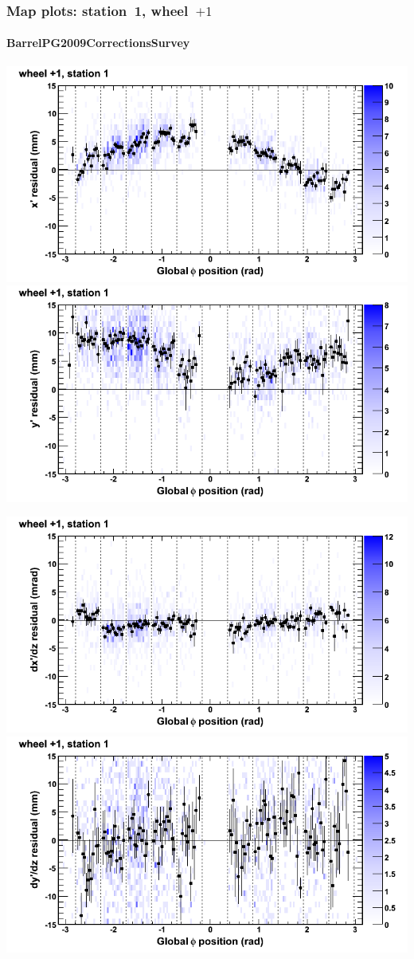 \documentclass[compress]{beamer}
\begin{document}
\begin{frame}
\frametitle{Map plots: station~1, wheel~$+1$}
\framesubtitle{BarrelPG2009CorrectionsSurvey}
\includegraphics[width=0.5\linewidth]{mapplots_01/DTvsphi_st1whD_x.png}
\includegraphics[width=0.5\linewidth]{mapplots_01/DTvsphi_st1whD_y.png}

\includegraphics[width=0.5\linewidth]{mapplots_01/DTvsphi_st1whD_dxdz.png}
\includegraphics[width=0.5\linewidth]{mapplots_01/DTvsphi_st1whD_dydz.png}
\end{frame}
\end{document}

